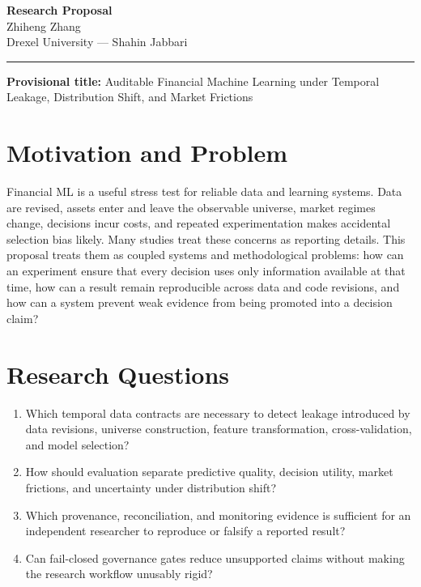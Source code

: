 \documentclass[11pt]{article}
\newcommand{\ApplicantName}{Zhiheng Zhang}
\begin{document}
\begin{center}
{\LARGE\bfseries Research Proposal}\\[0.25em]
{\large \ApplicantName}\\
Drexel University --- Shahin Jabbari
\end{center}
\vspace{0.35em}\hrule\vspace{0.65em}

\setlength{\parskip}{0.45em}
\textbf{Provisional title:} Auditable Financial Machine Learning under Temporal Leakage, Distribution Shift, and Market Frictions

\section*{Motivation and Problem}
Financial ML is a useful stress test for reliable data and learning systems. Data are revised, assets enter and leave the observable universe, market regimes change, decisions incur costs, and repeated experimentation makes accidental selection bias likely. Many studies treat these concerns as reporting details. This proposal treats them as coupled systems and methodological problems: how can an experiment ensure that every decision uses only information available at that time, how can a result remain reproducible across data and code revisions, and how can a system prevent weak evidence from being promoted into a decision claim?

\section*{Research Questions}
\begin{enumerate}
\item Which temporal data contracts are necessary to detect leakage introduced by data revisions, universe construction, feature transformation, cross-validation, and model selection?
\item How should evaluation separate predictive quality, decision utility, market frictions, and uncertainty under distribution shift?
\item Which provenance, reconciliation, and monitoring evidence is sufficient for an independent researcher to reproduce or falsify a reported result?
\item Can fail-closed governance gates reduce unsupported claims without making the research workflow unusably rigid?
\end{enumerate}
\end{document}
